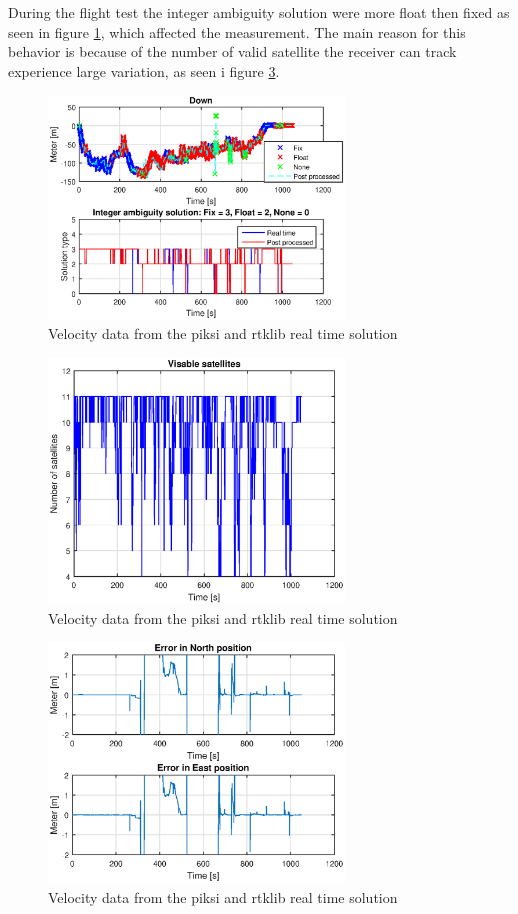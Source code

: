 During the flight test the integer ambiguity solution were more float then fixed as seen in figure \ref{figure:DownFlight}, which affected the measurement. The main reason for this behavior is because of the number of valid satellite the receiver can track experience large variation, as seen i figure \ref{figure:numSatFlight}.
\begin{figure}[H]
	\centering
		\includegraphics[width=0.7\textwidth]{figs/plots/downFlight.eps}
		\caption{Velocity data from the piksi and rtklib real time solution}
		\label{figure:DownFlight}
\end{figure}
\begin{figure}[H]
	\centering
		\includegraphics[width=0.7\textwidth]{figs/plots/numSatFlight.eps}
		\caption{Velocity data from the piksi and rtklib real time solution}
		\label{figure:numSatFlight}
\end{figure}
\begin{figure}[H]
	\centering
		\includegraphics[width=0.7\textwidth]{figs/plots/errorNorthEastFlight.eps}
		\caption{Velocity data from the piksi and rtklib real time solution}
		\label{figure:numSatFlight}
\end{figure}
